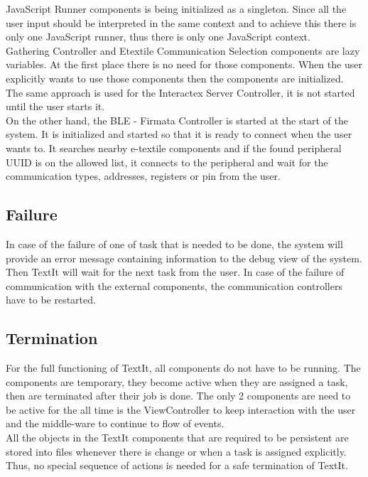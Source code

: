 JavaScript Runner components is being initialized as a singleton. Since all the user input should be interpreted in the same context and to achieve this there is only one JavaScript runner, thus there is only one JavaScript context. \\

Gathering Controller and Etextile Communication Selection components are lazy variables. At the first place there is no need for those components. When the user explicitly wants to use those components then the components are initialized. The same approach is used for the Interactex Server Controller, it is not started until the user starts it. \\

On the other hand, the BLE - Firmata Controller is started at the start of the system. It is initialized and started so that it is ready to connect when the user wants to. It searches nearby e-textile components and if the found peripheral UUID is on the allowed list, it connects to the peripheral and wait for the communication types, addresses, registers or pin from the user. 





\subsection{Failure}
In case of the failure of one of task that is needed to be done, the system will provide an error message containing information to the debug view of the system. Then TextIt will wait for the next task from the user. In case of the failure of communication with the external components, the communication controllers have to be restarted. 

\subsection{Termination}
For the full functioning of TextIt, all components do not have to be running. The components are temporary, they become active when they are assigned a task, then are terminated after their job is done. The only 2 components are need to be active for the all time is the ViewController to keep interaction with the user and the middle-ware to continue to flow of events. \\

All the objects in the TextIt components that are required to be persistent are stored into files whenever there is change or when a task is assigned explicitly. Thus, no special sequence of actions is needed for a safe termination of TextIt.



